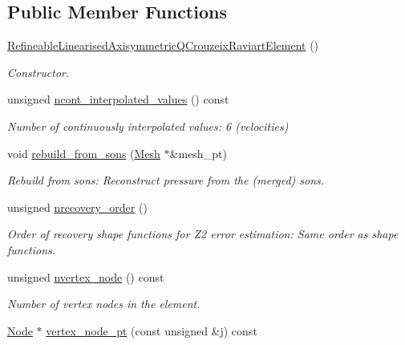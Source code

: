 \subsection*{Public Member Functions}
\begin{DoxyCompactItemize}
\item 
\hyperlink{classoomph_1_1RefineableLinearisedAxisymmetricQCrouzeixRaviartElement_a3a136f5f2bc6e8f0e99218b4057d7c9f}{Refineable\+Linearised\+Axisymmetric\+Q\+Crouzeix\+Raviart\+Element} ()
\begin{DoxyCompactList}\small\item\em Constructor. \end{DoxyCompactList}\item 
unsigned \hyperlink{classoomph_1_1RefineableLinearisedAxisymmetricQCrouzeixRaviartElement_afb9f9d03f8e2e0fb326d0d1fef0a5806}{ncont\+\_\+interpolated\+\_\+values} () const
\begin{DoxyCompactList}\small\item\em Number of continuously interpolated values\+: 6 (velocities) \end{DoxyCompactList}\item 
void \hyperlink{classoomph_1_1RefineableLinearisedAxisymmetricQCrouzeixRaviartElement_ad5593154711ea93a299b3c9b8d32cb5f}{rebuild\+\_\+from\+\_\+sons} (\hyperlink{classoomph_1_1Mesh}{Mesh} $\ast$\&mesh\+\_\+pt)
\begin{DoxyCompactList}\small\item\em Rebuild from sons\+: Reconstruct pressure from the (merged) sons. \end{DoxyCompactList}\item 
unsigned \hyperlink{classoomph_1_1RefineableLinearisedAxisymmetricQCrouzeixRaviartElement_ae56c7659e171cf0774b843d7db3ed270}{nrecovery\+\_\+order} ()
\begin{DoxyCompactList}\small\item\em Order of recovery shape functions for Z2 error estimation\+: Same order as shape functions. \end{DoxyCompactList}\item 
unsigned \hyperlink{classoomph_1_1RefineableLinearisedAxisymmetricQCrouzeixRaviartElement_a49c1a3a0ec108edf45d9b81c02807469}{nvertex\+\_\+node} () const
\begin{DoxyCompactList}\small\item\em Number of vertex nodes in the element. \end{DoxyCompactList}\item 
\hyperlink{classoomph_1_1Node}{Node} $\ast$ \hyperlink{classoomph_1_1RefineableLinearisedAxisymmetricQCrouzeixRaviartElement_ad04e4eabf235314ccea7b856cb4e3ef6}{vertex\+\_\+node\+\_\+pt} (const unsigned \&j) const

\end{DoxyCompactItemize}
